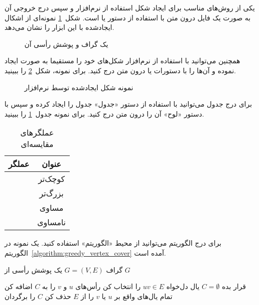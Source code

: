 یکی از روش‌های مناسب برای ایجاد شکل استفاده از نرم‌افزار  و سپس
درج خروجی آن به صورت یک فایل  درون متن 
با استفاده از دستور   یا  است.
شکل~\ref{figure:vertex_cover} نمونه‌ای از اشکال ایجادشده با این ابزار را نشان می‌دهد.


\begin{figure}[ht]
\caption{یک گراف و پوشش رأسی آن}
\label{figure:vertex_cover}
\end{figure}

\bigskip
همچنین می‌توانید با استفاده از نرم‌افزار  شکل‌های خود را مستقیما
به صورت  ایجاد نموده و آن‌ها را با دستورات  یا   
درون متن درج کنید. برای نمونه، شکل~\ref{figure:directional_graph} را ببینید.


\begin{figure}[ht]
\caption{نمونه شکل ایجادشده توسط نرم‌افزار }
\label{figure:directional_graph}
\end{figure}

برای درج جدول می‌توانید با استفاده از دستور  «جدول»
جدول را ایجاد کرده و سپس با دستور  «لوح»  آن را درون متن درج کنید.
برای نمونه جدول~\ref{table:comparative_operators} را ببینید.

\vspace{1.5em}

\begin{table}[ht]
\centering
\caption{عملگرهای مقایسه‌ای}

\begin{tabular}{|c|c|}
\hline 
\bf عملگر & \bf عنوان \\ 
\hline \hline 
\lr{\tt{<}} & کوچک‌تر \\ 
\lr{\tt{>}} & بزرگ‌تر \\
\lr{\tt{==}} &  مساوی \\ 
\lr{\tt{<>}} & نامساوی \\ 
\hline
\end{tabular}

\label{table:comparative_operators}
\end{table}

برای درج الگوریتم می‌توانید از محیط «الگوریتم» استفاده کنید.
یک نمونه در الگوریتم~\ref{algorithm:greedy_vertex_cover} آمده است.

\begin{algorithm}
\label{algorithm:greedy_vertex_cover}
\begin{algorithmic}[1]
\Require گراف $G=(V, E)$
\Ensure یک پوشش رأسی از $G$

\State قرار بده $C = \emptyset$  %
\State یال دل‌‌خواه $uv \in E$ را انتخاب کن
\State رأس‌های $u$ و $v$ را به $C$ اضافه کن
\State تمام یال‌های واقع بر $u$ یا $v$ را از $E$ حذف کن
\EndWhile
\State $C$ را برگردان
\end{algorithmic}
\end{algorithm}

